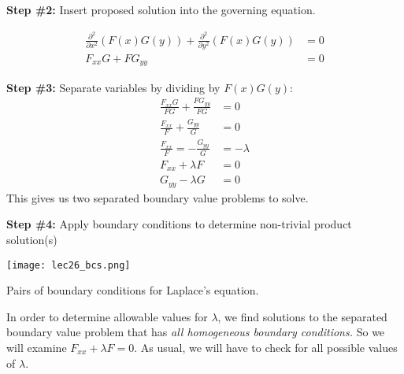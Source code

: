\vspace{0.25cm}

\noindent\textbf{Step \#2:} Insert proposed solution into the governing equation.

\begin{align*}
\frac{\partial^2}{\partial x^2}\left(F(x)G(y)\right) + \frac{\partial^2}{\partial y^2}\left(F(x)G(y)\right) &= 0 \\
F_{xx}G + FG_{yy} &= 0
\end{align*}

\vspace{4.5cm}

\noindent\textbf{Step \#3:} Separate variables by dividing by $F(x)G(y)$:
\begin{align*}
\frac{F_{xx}G}{FG} + \frac{FG_{yy}}{FG} &= 0 \\
\frac{F_{xx}}{F} + \frac{G_{yy}}{G} &= 0 \\
\frac{F_{xx}}{F} = -\frac{G_{yy}}{G} &= -\lambda \\
F_{xx}+\lambda F &= 0 \\
G_{yy}-\lambda G &= 0
\end{align*}
This gives us two separated boundary value problems to solve.

\vspace{0.5cm}

\noindent\textbf{Step \#4:} Apply boundary conditions to determine non-trivial product solution(s)
\begin{marginfigure}
\texttt{[image: lec26\_bcs.png]}
\caption{Pairs of boundary conditions for Laplace's equation.}
\label{fig:lec26-bcs}
\end{marginfigure}

\vspace{0.1cm}

\noindent In order to determine allowable values for $\lambda$, we find solutions to the separated boundary value problem that has \emph{all homogeneous boundary conditions.}  So we will examine $F_{xx} + \lambda F = 0$.  As usual, we will have to check for all possible values of $\lambda$.

